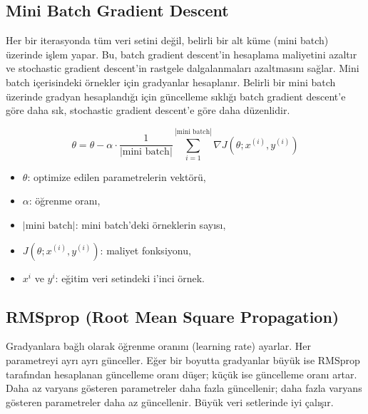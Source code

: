 \newpage

\subsection{Mini Batch Gradient Descent}

Her bir iterasyonda tüm veri setini değil, belirli bir alt küme (mini batch) üzerinde işlem yapar. Bu, batch gradient descent'in hesaplama maliyetini azaltır ve stochastic gradient descent'in rastgele dalgalanmaları azaltmasını sağlar. Mini batch içerisindeki örnekler için gradyanlar hesaplanır. Belirli bir mini batch üzerinde gradyan hesaplandığı için güncelleme sıklığı batch gradient descent'e göre daha sık, stochastic gradient descent'e göre daha düzenlidir.

\[\theta = \theta - \alpha \cdot \frac{1}{|\text{mini batch}|} \sum_{i=1}^{|\text{mini batch}|} \nabla J(\theta;x^{(i)},y^{(i)})\]

\begin{itemize}
	\item $\theta$: optimize edilen parametrelerin vektörü,
	\item $\alpha$: öğrenme oranı,
	\item ${|\text{mini batch}|}$: mini batch'deki örneklerin sayısı,
	\item $J(\theta;x^{(i)},y^{(i)})$: maliyet fonksiyonu,
	\item $x^{i}$ ve $y^{i}$: eğitim veri setindeki i'inci örnek.
\end{itemize}

\newpage

\subsection{RMSprop (Root Mean Square Propagation)}
Gradyanlara bağlı olarak öğrenme oranını (learning rate) ayarlar. Her parametreyi ayrı ayrı günceller. Eğer bir boyutta gradyanlar büyük ise RMSprop tarafından hesaplanan güncelleme oranı düşer; küçük ise güncelleme oranı artar. Daha az varyans gösteren parametreler daha fazla güncellenir; daha fazla varyans gösteren parametreler daha az güncellenir. Büyük veri setlerinde iyi çalışır.

